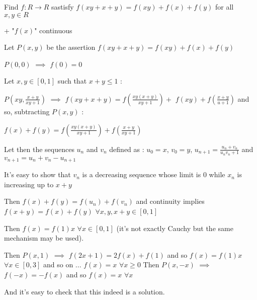 


\begin{solution}
	\begin{tcolorbox}Find $ f: R \to R$ sastisfy
$ f(xy + x + y) = f(xy) + f(x) + f(y)$ for all $ x,y \in R$\end{tcolorbox}
+ "$ f(x)$" continuous

Let $ P(x,y)$ be the assertion $ f(xy+x+y)=f(xy)+f(x)+f(y)$

$ P(0,0)$ $ \implies$ $ f(0)=0$

Let $ x,y\in[0,1]$ such that $ x+y\le 1$ :

$ P(xy,\frac{x+y}{xy+1})$ $ \implies$ $ f(xy+x+y)=f(\frac{xy(x+y)}{xy+1})+$ $ f(xy)+f(\frac{x+y}{u+1})$ and so, subtracting $ P(x,y)$ :

$ f(x)+f(y)=f(\frac{xy(x+y)}{xy+1})+f(\frac{x+y}{xy+1})$

Let then the sequences $ u_n$ and $ v_n$ defined as :
$ u_0=x$, $ v_0=y$, $ u_{n+1}=\frac{u_n+v_n}{u_nv_n+1}$ and $ v_{n+1}=u_n+v_n-u_{n+1}$

It's easy to show that $ v_n$ is a decreasing sequence whose limit is $ 0$ while $ x_n$ is increasing up to $ x+y$

Then $ f(x)+f(y)=f(u_n)+f(v_n)$ and continuity implies $ f(x+y)=f(x)+f(y)$ $ \forall x,y,x+y\in[0,1]$

Then $ f(x)=f(1)x$ $ \forall x\in[0,1]$ (it's not exactly Cauchy but the same mechanism may be used).

Then $ P(x,1)$ $ \implies$ $ f(2x+1)=2f(x)+f(1)$ and so $ f(x)=f(1)x$ $ \forall x\in[0,3]$ and so on ... $ f(x)=x$ $ \forall x\ge 0$
Then $ P(x,-x)$ $ \implies$ $ f(-x)=-f(x)$ and so $ f(x)=x$ $ \forall x$

And it's easy to check that this indeed is a solution.
\end{solution}



